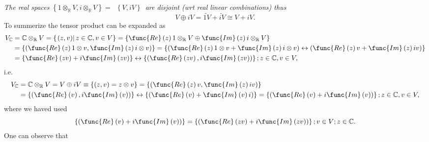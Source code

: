 \documentclass[aps,preprint]{revtex4}
\begin{document}
\emph{The real spaces }$\left\{ 1\otimes_{\mathbb{R}}V,i\otimes_{\mathbb{R}%
}V\right\} =$\emph{\ }$\left\{ V,iV\right\} $\emph{\ are disjoint (wrt real
linear combinations) thus} 
\begin{equation}
V\oplus iV=\widetilde{1V}+\widetilde{iV}\cong V+iV.
\end{equation}
To summerize the tensor product can be expanded as 
\begin{align}
V_{\mathbb{C}} & =\mathbb{C}\otimes_{\mathbb{R}}V=\left\{ \left. \left(
z,v\right) \right\vert z\in\mathbb{C},v\in V\right\} =\left\{ \func{Re}%
\left( z\right) 1\otimes_{\mathbb{R}}V\oplus \func{Im}\left( z\right)
i\otimes_{\mathbb{R}}V\right\} \\
& =\left\{ \left( \func{Re}\left( z\right) 1\otimes v,\func{Im}\left(
z\right) i\otimes v\right) \right\} =\left\{ \left( \func{Re}\left( z\right)
1\otimes v+\func{Im}\left( z\right) i\otimes v\right) \leftrightarrow\left( 
\func{Re}\left( z\right) v+\func{Im}\left( z\right) iv\right) \right\} \\
& =\left\{ \func{Re}\left( zv\right) +i\func{Im}\left( zv\right) \right\}
\leftrightarrow\left\{ \left( \func{Re}\left( zv\right) ,i\func{Im}\left(
zv\right) \right) \right\} ;z\in\mathbb{C},v\in V,
\end{align}
i.e. 
\begin{align}
V_{\mathbb{C}} & =\mathbb{C}\otimes_{\mathbb{R}}V=V\oplus iV\equiv\left\{
\left( z,v\right) =z\otimes v\right\} =\left\{ \left( \func{Re}\left(
z\right) v,\func{Im}\left( z\right) iv\right) \right\} \\
& =\left\{ \left( \func{Re}\left( v\right) ,i\func{Im}\left( v\right)
\right) \right\} \leftrightarrow\left\{ \left( \func{Re}\left( v\right) +%
\func{Im}\left( v\right) i\right) \right\} =\left\{ \left( \func{Re}\left(
v\right) +i\func{Im}\left( v\right) \right) \right\} ;z\in\mathbb{C},v\in V,
\end{align}
where we haved used 
\begin{equation}
\left\{ \left( \func{Re}\left( v\right) +i\func{Im}\left( v\right) \right)
\right\} =\left\{ \left( \func{Re}\left( zv\right) +i\func{Im}\left(
zv\right) \right) \right\} ;v\in V;z\in\mathbb{C}.
\end{equation}
One can observe that 
\end{document}
